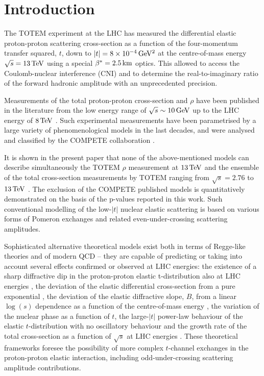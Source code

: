 \section{Introduction}
\label{sec:introduction}

The TOTEM experiment at the LHC has measured the differential elastic proton-proton scattering cross-section as a function of the four-momentum transfer squared, $t$, down to $|t| = 8\times10^{-4}\,{\rm GeV^2}$ at the centre-of-mass energy $\sqrt s = 13\,{\rm TeV}$ using a special $\beta^* = 2.5\,{\rm km}$ optics. This allowed to access the Coulomb-nuclear interference (CNI) and to determine the real-to-imaginary ratio of the forward hadronic amplitude with an unprecedented precision.

Measurements of the total proton-proton cross-section and $\rho$ have been published in the literature from the low energy range of $\sqrt s \sim 10\,{\rm GeV}$ up to the LHC energy of $8\,{\rm TeV}$ \cite{pdg-2016}. Such experimental measurements have been parametrised by a large variety of phenomenological models in the last decades, and were analysed and classified by the COMPETE collaboration \cite{compete}.

It is shown in the present paper that none of the above-mentioned models can describe simultaneously the TOTEM $\rho$ measurement at $13\,{\rm TeV}$ and the ensemble of the total cross-section measurements by TOTEM ranging from $\sqrt s = 2.76$ to $13\,{\rm TeV}$ \cite{totem-7tev-tot2,totem-8tev-90m,totem-8tev-1km,totem-13tev-90m}. The exclusion of the COMPETE published models is quantitatively demonstrated on the basis of the p-values reported in this work. Such conventional modelling of the low-$|t|$ nuclear elastic scattering is based on various forms of Pomeron exchanges and related even-under-crossing scattering amplitudes.

Sophisticated alternative theoretical models exist both in terms of Regge-like theories \cite{nicolescu-1992} and of modern QCD \cite{braun} -- they are capable of predicting or taking into account several effects confirmed or observed at LHC energies: the existence of a sharp diffractive dip in the proton-proton elastic t-distribution also at LHC energies \cite{totem-7tev-first}, the deviation of the elastic differential cross-section from a pure exponential \cite{totem-8tev-90m}, the deviation of the elastic diffractive slope, $B$, from a linear $\log(s)$ dependence as a function of the centre-of-mass energy \cite{totem-13tev-90m}, the variation of the nuclear phase as a function of $t$, the large-$|t|$ power-law behaviour of the elastic $t$-distribution with no oscillatory behaviour and the growth rate of the total cross-section as a function of $\sqrt s$ at LHC energies \cite{totem-13tev-90m}. These theoretical frameworks foresee the possibility of more complex $t$-channel exchanges in the proton-proton elastic interaction, including odd-under-crossing scattering amplitude contributions.

